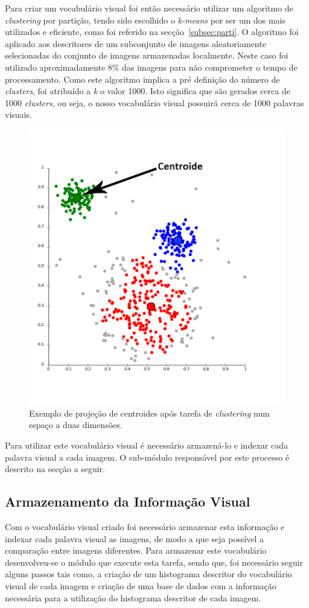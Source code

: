 Para criar um vocabulário visual foi então necessário utilizar um algoritmo de \textit{clustering} por partição, tendo sido escolhido o \textit{k-means} por ser um dos mais utilizados e eficiente, como foi referido na secção~\ref{subsec:parti}. O algoritmo foi aplicado aos descritores de um subconjunto de imagens aleatoriamente selecionadas do conjunto de imagens armazenadas localmente. Neste caso foi utilizado aproximadamente 8\% das imagens para não comprometer o tempo de processamento. Como este algoritmo implica a pré definição do número de \textit{clusters}, foi atribuído a \textit{k} o valor 1000. Isto significa que são gerados cerca de 1000 \textit{clusters}, ou seja, o nosso vocabulário visual possuirá cerca de 1000 palavras visuais.

\begin{figure}
\centering
\includegraphics[width=0.6\linewidth]{./figures/centroides}
\caption{Exemplo de projeção de centroides após tarefa de \textit{clustering} num espaço a duas dimensões.}
\label{fig:centroides}
\end{figure}

Para utilizar este vocabulário visual é necessário armazená-lo e indexar cada palavra visual a cada imagem. O sub-módulo responsável por este processo é descrito na secção a seguir.

\subsection{Armazenamento da Informação Visual}

Com o vocabulário visual criado foi necessário armazenar esta informação e indexar cada palavra visual as imagens, de modo a que seja possível a comparação entre imagens diferentes. Para armazenar este vocabulário desenvolveu-se o módulo que execute esta tarefa, sendo que, foi necessário seguir alguns passos tais como, a criação de um histograma descritor do vocabulário visual de cada imagem e criação de uma base de dados com a informação necessária para a utilização do histograma descritor de cada imagem.

